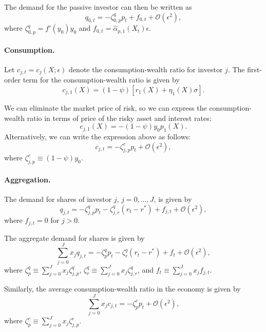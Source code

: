 \documentclass[11pt,english]{article}
\begin{document}
The demand for the passive investor can then be written as
\begin{equation}
    q_{0,t} = - \zeta_{0,p}^q p_t + f_{0,t} + \mathcal{O}(\epsilon^2),
\end{equation}
where $\zeta_{0,p}^q = f'(y_0) y_0$ and $f_{0,t} = \hat{\alpha}_{p,1}(X_t) \epsilon$.

\paragraph{Consumption.} Let $c_{j,t} = c_j(X;\epsilon)$ denote the consumption-wealth ratio for investor $j$. The first-order term for the consumption-wealth ratio is given by
\begin{equation}
    c_{j,1}(X) = (1-\psi) \left[ r_1(X) + \eta_1(X) \sigma\right]. 
\end{equation}

We can eliminate the market price of risk, so we can express the consumption-wealth ratio in terms of price of the risky asset and interest rates:
\begin{equation}
    c_{j,1}(X) = -(1-\psi)  y_0 p_1(X).
\end{equation}
Alternatively, we can write the expression above as follows:
\begin{equation}
    c_{j,t} = - \zeta_{j,p}^c p_t + \mathcal{O}(\epsilon^2),
\end{equation}
where $\zeta_{j,p}^c \equiv (1-\psi) y_0$.

\paragraph{Aggregation.} The demand for shares of investor $j$, $j = 0, \ldots, J$, is given by
\begin{equation}
    q_{j,t} = -\zeta_{j,p}^q p_t - \zeta_{j,r}^q (r_t - r^*) + f_{j,t} + \mathcal{O}(\epsilon^2),
\end{equation}
where $f_{j,t}= 0$ for $j > 0$. 

The aggregate demand for shares is given by
\begin{equation}
    \sum_{j=0}^J x_j q_{j,t} = -\zeta_{p}^q p_t - \zeta_{r}^q (r_t - r^*) + f_{t}+ \mathcal{O}(\epsilon^2),
\end{equation}
where $\zeta_{p}^q \equiv \sum_{j=0}^J x_j \zeta_{j,p}^q$, $\zeta_{r}^q \equiv \sum_{j=0}^J x_j \zeta_{j,r}^q$, and $f_t \equiv \sum_{j=0}^J x_j f_{j,t}$.

Similarly, the average consumption-wealth ratio in the economy is given by
\begin{equation}
    \sum_{j=0}^J x_j c_{j,t} = - \zeta_{p}^c p_t + \mathcal{O}(\epsilon^2),
\end{equation}
where $\zeta_p^c \equiv \sum_{j=0}^J x_j \zeta_{j,p}^c$.
\end{document}
